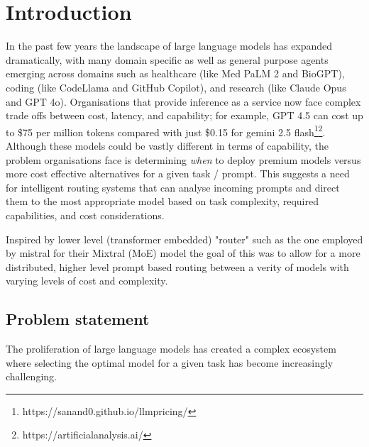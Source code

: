 \chapter{Introduction}
\label{ch:into}

In the past few years the landscape of large language models has expanded dramatically, with many domain specific as well as general purpose agents emerging across domains such as healthcare (like Med PaLM 2 and BioGPT), coding (like CodeLlama and GitHub Copilot), and research (like Claude Opus and GPT 4o). Organisations that provide inference as a service now face complex trade offs between cost, latency, and capability; for example, GPT 4.5 can cost up to \$75 per million tokens compared with just \$0.15 for gemini 2.5 flash\footnote{https://sanand0.github.io/llmpricing/}\footnote{https://artificialanalysis.ai/}. Although these models could be vastly different in terms of capability, the problem organisations face is determining \textit{when} to deploy premium models versus more cost effective alternatives for a given task / prompt. This suggests a need for intelligent routing systems that can analyse incoming prompts and direct them to the most appropriate model based on task complexity, required capabilities, and cost considerations.

Inspired by lower level (transformer embedded) "router" such as the one employed by mistral for their Mixtral (MoE) model the goal of this was to allow for a more distributed, higher level prompt based routing between a verity of models with varying levels of cost and complexity.

\section{Problem statement}
\label{sec:intro_prob_art}

The proliferation of large language models has created a complex ecosystem where selecting the optimal model for a given task has become increasingly challenging.

